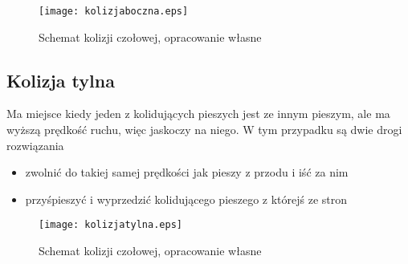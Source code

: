 \begin{figure}
\centering
\texttt{[image: kolizjaboczna.eps]}
\caption{Schemat kolizji czołowej, opracowanie własne}
\end{figure}

\subsection{Kolizja tylna}

Ma miejsce kiedy jeden z kolidujących pieszych jest ze innym pieszym, ale ma wyższą prędkość ruchu, więc jaskoczy na niego. W tym przypadku są dwie drogi rozwiązania

\begin{itemize}
\item zwolnić do takiej samej prędkości jak pieszy z przodu i iść za nim
\item przyśpieszyć i wyprzedzić kolidującego pieszego z którejś ze stron
\end{itemize}

\begin{figure}
\centering
\texttt{[image: kolizjatylna.eps]}
\caption{Schemat kolizji czołowej, opracowanie własne}
\end{figure}
